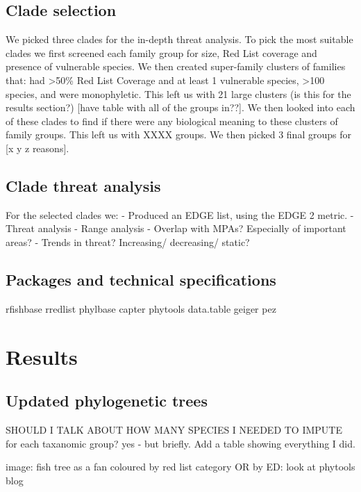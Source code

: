\documentclass[11pt]{article}
\begin{document}
\subsection{Clade selection}

We picked three clades for the in-depth threat analysis. To pick the most 
suitable clades we first screened each family group for size, Red List coverage 
and presence of vulnerable species. We then created super-family clusters of 
families that: had >50\% Red List Coverage and at least 1 vulnerable species, 
>100 species, and were monophyletic. 
This left us with 21 large clusters (is this for the results section?) [have 
table with all of the groups in??]. We then 
looked into each of these clades to find if there were any biological meaning 
to these clusters of family groups. This left us with XXXX groups.
We then picked 3 final groups for [x y z reasons]. 

 

\subsection{Clade threat analysis}

For the selected clades we:
- Produced an EDGE list, using the EDGE 2 metric. 
- Threat analysis
- Range analysis
- Overlap with MPAs? Especially of important areas?
- Trends in threat? Increasing/ decreasing/ static?





\subsection{Packages and technical specifications}

rfishbase
rredlist	
phylbase
capter
phytools
data.table
geiger
pez


\section{Results}
\noindent

\subsection{Updated phylogenetic trees}
SHOULD I TALK ABOUT HOW MANY SPECIES I NEEDED TO IMPUTE for each taxanomic 
group? 
yes - but briefly. Add a table showing everything I did. 

image: fish tree as a fan coloured by red list category OR by ED: look at 
phytools blog 
\end{document}
